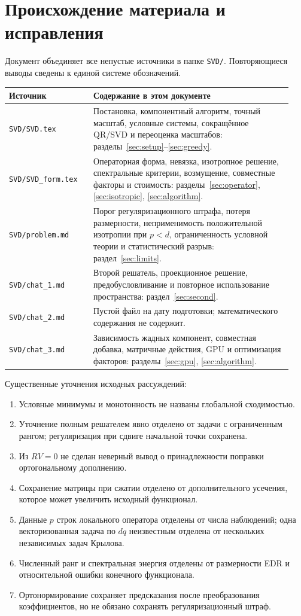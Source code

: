 \documentclass[11pt,a4paper]{article}
\numberwithin{equation}{section}
\theoremstyle{remark}
\newcommand{\src}[1]{\nolinkurl{#1}}
\begin{document}
\appendix
\section{Происхождение материала и исправления}\label{sec:sources}

Документ объединяет все непустые источники в папке \src{SVD/}.
Повторяющиеся выводы сведены к единой системе обозначений.
\begin{longtable}{@{}>{\raggedright\arraybackslash}p{0.28\linewidth}
 >{\raggedright\arraybackslash}p{0.66\linewidth}@{}}
\toprule
Источник & Содержание в этом документе\\
\midrule
\endhead
\src{SVD/SVD.tex} & Постановка, компонентный алгоритм, точный масштаб,
условные системы, сокращённое QR/SVD и переоценка масштабов:
разделы~\ref{sec:setup}--\ref{sec:greedy}.\\
\src{SVD/SVD_form.tex} & Операторная форма, невязка, изотропное решение,
спектральные критерии, возмущение, совместные факторы и стоимость:
разделы~\ref{sec:operator}, \ref{sec:isotropic}, \ref{sec:algorithm}.\\
\src{SVD/problem.md} & Порог регуляризационного штрафа, потеря размерности,
неприменимость положительной изотропии при $p<d$, ограниченность
условной теории и статистический разрыв: раздел~\ref{sec:limits}.\\
\src{SVD/chat_1.md} & Второй решатель, проекционное решение,
предобусловливание и повторное использование пространства:
раздел~\ref{sec:second}.\\
\src{SVD/chat_2.md} & Пустой файл на дату подготовки; математического
содержания не содержит.\\
\src{SVD/chat_3.md} & Зависимость жадных компонент, совместная добавка,
матричные действия, GPU и оптимизация факторов:
разделы~\ref{sec:gpu}, \ref{sec:algorithm}.\\
\bottomrule
\end{longtable}

Существенные уточнения исходных рассуждений:
\begin{enumerate}
 \item Условные минимумы и монотонность не названы глобальной сходимостью.
 \item Уточнение полным решателем явно отделено от задачи с ограниченным
 рангом; регуляризация при сдвиге начальной точки сохранена.
 \item Из $RV=0$ не сделан неверный вывод о принадлежности поправки
 ортогональному дополнению.
 \item Сохранение матрицы при сжатии отделено от дополнительного усечения,
 которое может увеличить исходный функционал.
 \item Данные $p$ строк локального оператора отделены от числа наблюдений;
 одна векторизованная задача по $dq$ неизвестным отделена от нескольких
 независимых задач Крылова.
 \item Численный ранг и спектральная энергия отделены от размерности EDR
 и относительной ошибки конечного функционала.
 \item Ортонормирование сохраняет предсказания после преобразования
 коэффициентов, но не обязано сохранять регуляризационный штраф.
\end{enumerate}
\end{document}
